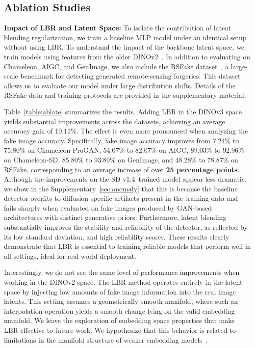 \subsection{Ablation Studies}
\textbf{Impact of LBR and Latent Space: }To isolate the contribution of latent blending regularization, we train a baseline MLP model under an identical setup without using LBR. To understand the impact of the backbone latent space, we train models using features from the older DINOv2~\cite{oquab2024dinov2}. In addition to evaluating on Chameleon, AIGC, and GenImage, we also include the RSFake dataset~\cite{tan2025rsfake}, a large-scale benchmark for detecting generated remote-sensing forgeries. This dataset allows us to evaluate our model under large distribution shifts. Details of the RSFake data and training protocols are provided in the supplementary material.


Table~\ref{table:ablate} summarizes the results. Adding LBR in the DINOv3 space yields substantial improvements across the datasets, achieving an average accuracy gain of 10.11\%. The effect is even more pronounced when analyzing the fake image accuracy. Specifically, fake image accuracy improves from 7.24\% to 75.80\% on Chameleon-ProGAN, 54.07\% to 82.07\% on AIGC, 89.03\% to 92.96\% on Chameleon-SD, 85.80\% to 93.89\% on GenImage, and 48.28\% to 78.87\% on RSFake, corresponding to an average increase of over \textbf{25 percentage points}. 
Although the improvements on the SD v1.4–trained model appear less dramatic, we show in the Supplementary~\ref{sec:anomaly} that this is because the baseline detector overfits to diffusion-specific artifacts present in the training data and fails sharply when evaluated on fake images produced by GAN-based architectures with distinct generative priors. Furthermore, latent blending substantially improves the stability and reliability of the detector, as reflected by its low standard deviation, and high reliability scores. These results clearly demonstrate that LBR is essential to training reliable models that perform well in all settings, ideal for real-world deployment.



Interestingly, we do not see the same level of performance improvements when working in the DINOv2 space. The LBR method operates entirely in the latent space by injecting low amounts of fake image information into the real image latents. This setting assumes a geometrically smooth manifold, where such an interpolation operation yields a smooth change lying on the valid embedding manifold. We leave the exploration of embedding space properties that make LBR effective to future work. We hypothesize that this behavior is related to limitations in the manifold structure of weaker embedding models~\cite{kang2025clip, li2025lost, liu2024assessing}.


